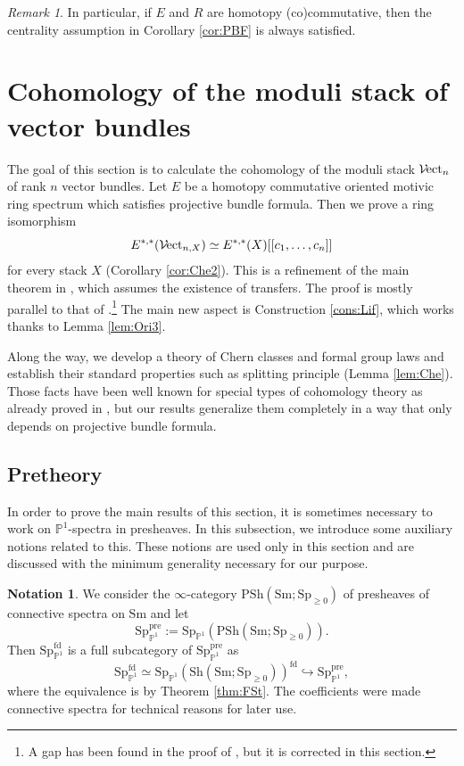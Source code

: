\documentclass{amsart}
\theoremstyle{plain}
\theoremstyle{definition}
\newtheorem{notation}[theorem]{Notation}
\theoremstyle{remark}
\newtheorem{remark}[theorem]{Remark}
\numberwithin{equation}{theorem}
\newcommand{\mbb}[1]{\mathbb{#1}}
\newcommand{\PSh}{\mathrm{PSh}}
\newcommand{\Sh}{\mathrm{Sh}}
\newcommand{\Sm}{\mathrm{Sm}}
\newcommand{\Sp}{\mathrm{Sp}}
\newcommand{\fd}{\mathrm{fd}}
\newcommand{\pre}{\mathrm{pre}}
\newcommand{\SpP}{\mathrm{Sp}_{\mathbb{P}^1}}
\newcommand{\Vect}{{\mathcal{V}\mspace{-2.0mu}\mathrm{ect}}}
\begin{document}
\begin{remark}
In particular, if $E$ and $R$ are homotopy (co)commutative, then the centrality assumption in Corollary \ref{cor:PBF} is always satisfied.
\end{remark}




\newpage

\section{Cohomology of the moduli stack of vector bundles}\label{Vec}

The goal of this section is to calculate the cohomology of the moduli stack $\Vect_n$ of rank $n$ vector bundles.
Let $E$ be a homotopy commutative oriented motivic ring spectrum which satisfies projective bundle formula.
Then we prove a ring isomorphism 
\[
	E^{*,*}(\Vect_{n,X}) \simeq E^{*,*}(X)[[c_1,\dotsc,c_n]]
\]
for every stack $X$ (Corollary \ref{cor:Che2}).
This is a refinement of the main theorem in \cite{AI}, which assumes the existence of transfers.
The proof is mostly parallel to that of \cite{AI}.\footnote{A gap has been found in the proof of \cite{AI}, but it is corrected in this section.}
The main new aspect is Construction \ref{cons:Lif}, which works thanks to Lemma \ref{lem:Ori3}.

Along the way, we develop a theory of Chern classes and formal group laws and establish their standard properties such as splitting principle (Lemma \ref{lem:Che}).
Those facts have been well known for special types of cohomology theory as already proved in \cite{SAG6}, but our results generalize them completely in a way that only depends on projective bundle formula.


\subsection{Pretheory}\label{PTh}

In order to prove the main results of this section, it is sometimes necessary to work on $\mbb{P}^1$-spectra in presheaves.
In this subsection, we introduce some auxiliary notions related to this.
These notions are used only in this section and are discussed with the minimum generality necessary for our purpose.

\begin{notation}
We consider the $\infty$-category $\PSh(\Sm;\Sp_{\ge 0})$ of presheaves of connective spectra on $\Sm$ and let
\[
	\SpP^\pre := \SpP(\PSh(\Sm;\Sp_{\ge 0})).
\]
Then $\SpP^\fd$ is a full subcategory of $\SpP^\pre$ as
\[
	\SpP^\fd \simeq \SpP(\Sh(\Sm;\Sp_{\ge 0}))^\fd \hookrightarrow \SpP^\pre,
\]
where the equivalence is by Theorem \ref{thm:FSt}.
The coefficients were made connective spectra for technical reasons for later use.
\end{notation}
\end{document}

